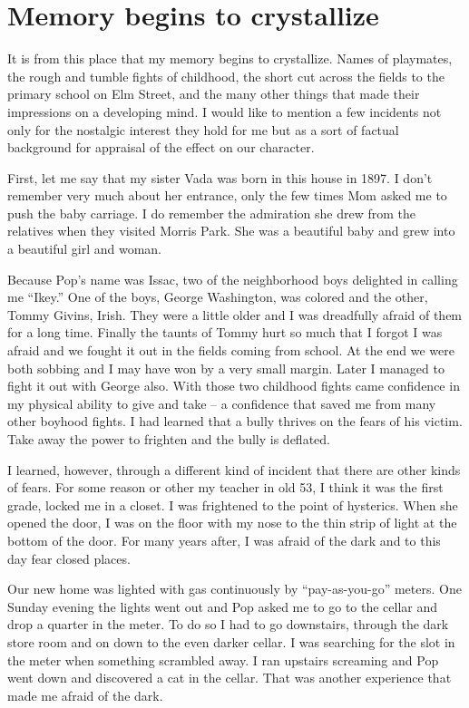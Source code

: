 \documentclass[12pt]{book}              %
\begin{document}
\chapter{Memory begins to crystallize}

It is from this place that my memory begins to crystallize. Names of playmates, the rough and tumble fights of childhood, the short cut across the fields to the primary school on Elm Street, and the many other things that made their impressions on a developing mind. I would like to mention a few incidents not only for the nostalgic interest they hold for me but as a sort of factual background for appraisal of the effect on our character. 

First, let me say that my sister Vada was born in this house in 1897. I don't remember very much about her entrance, only the few times Mom asked me to push the baby carriage. I do remember the admiration she drew from the relatives when they visited Morris Park. She was a beautiful baby and grew into a beautiful girl and woman.

Because Pop's name was Issac, two of the neighborhood boys delighted in calling me ``Ikey.'' One of the boys, George Washington, was colored and the other, Tommy Givins, Irish. They were a little older and I was dreadfully afraid of them for a long time. Finally the taunts of Tommy hurt so much that I forgot I was afraid and we fought it out in the fields coming from school. At the end we were both sobbing and I may have won by a very small margin. Later I managed to fight it out with George also. With those two childhood fights came confidence in my physical ability to give and take -- a confidence that saved me from many other boyhood fights. I had learned that a bully thrives on the fears of his victim. Take away the power to frighten and the bully is deflated. 

I learned, however, through a different kind of incident that there are other kinds of fears. For some reason or other my teacher in old 53, I think it was the first grade, locked me in a closet. I was frightened to the point of hysterics. When she opened the door, I was on the floor with my nose to the thin strip of light at the bottom of the door. For many years after, I was afraid of the dark and to this day fear closed places. 

Our new home was lighted with gas continuously by ``pay-as-you-go'' meters. One Sunday evening the lights went out and Pop asked me to go to the cellar and drop a quarter in the meter. To do so I had to go downstairs, through the dark store room and on down to the even darker cellar. I was searching for the slot in the meter when something scrambled away. I ran upstairs screaming and Pop went down and discovered a cat in the cellar. That was another experience that made me afraid of the dark.
\end{document}
